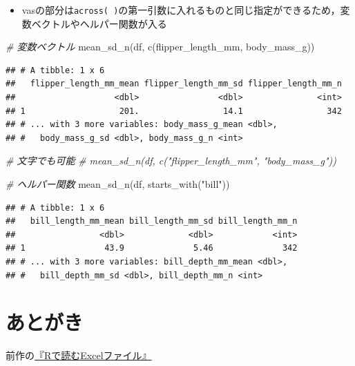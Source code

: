 \documentclass[
  xelatex,ja=standard, b5paper]{bxjsbook}
\newenvironment{Shaded}{\begin{snugshade}}{\end{snugshade}}
\newcommand{\CommentTok}[1]{\textcolor[rgb]{0.56,0.35,0.01}{\textit{#1}}}
\newcommand{\FunctionTok}[1]{\textcolor[rgb]{0.00,0.00,0.00}{#1}}
\newcommand{\NormalTok}[1]{#1}
\newcommand{\StringTok}[1]{\textcolor[rgb]{0.31,0.60,0.02}{#1}}
\providecommand{\tightlist}{%
  \setlength{\itemsep}{0pt}\setlength{\parskip}{0pt}}
\begin{document}
\begin{itemize}
\tightlist
\item
  vasの部分は\texttt{across(\ )}の第一引数に入れるものと同じ指定ができるため，変数ベクトルやヘルパー関数が入る
\end{itemize}

\begin{Shaded}
\begin{Highlighting}[]
\CommentTok{\# 変数ベクトル}
\FunctionTok{mean\_sd\_n}\NormalTok{(df, }\FunctionTok{c}\NormalTok{(flipper\_length\_mm, body\_mass\_g))}
\end{Highlighting}
\end{Shaded}

\begin{verbatim}
## # A tibble: 1 x 6
##   flipper_length_mm_mean flipper_length_mm_sd flipper_length_mm_n
##                    <dbl>                <dbl>               <int>
## 1                   201.                 14.1                 342
## # ... with 3 more variables: body_mass_g_mean <dbl>,
## #   body_mass_g_sd <dbl>, body_mass_g_n <int>
\end{verbatim}

\begin{Shaded}
\begin{Highlighting}[]
\CommentTok{\# 文字でも可能}
\CommentTok{\# mean\_sd\_n(df, c("flipper\_length\_mm", "body\_mass\_g"))}

\CommentTok{\# ヘルパー関数}
\FunctionTok{mean\_sd\_n}\NormalTok{(df, }\FunctionTok{starts\_with}\NormalTok{(}\StringTok{"bill"}\NormalTok{))}
\end{Highlighting}
\end{Shaded}

\begin{verbatim}
## # A tibble: 1 x 6
##   bill_length_mm_mean bill_length_mm_sd bill_length_mm_n
##                 <dbl>             <dbl>            <int>
## 1                43.9              5.46              342
## # ... with 3 more variables: bill_depth_mm_mean <dbl>,
## #   bill_depth_mm_sd <dbl>, bill_depth_mm_n <int>
\end{verbatim}

\hypertarget{atogaki}{%
\chapter*{あとがき}\label{atogaki}}

前作の\href{https://techbookfest.org/product/4794168259903488?productVariantID=5913872206659584}{『Rで読むExcelファイル』}
\end{document}
